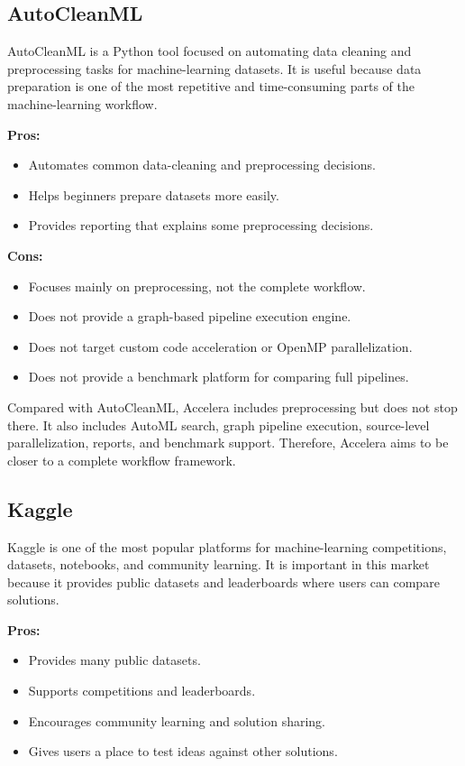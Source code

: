 \documentclass[12pt,a4paper]{report}
\begin{document}
\subsection{AutoCleanML}

AutoCleanML is a Python tool focused on automating data cleaning and
preprocessing tasks for machine-learning datasets. It is useful because data
preparation is one of the most repetitive and time-consuming parts of the
machine-learning workflow.

\textbf{Pros:}
\begin{itemize}
  \item Automates common data-cleaning and preprocessing decisions.
  \item Helps beginners prepare datasets more easily.
  \item Provides reporting that explains some preprocessing decisions.
\end{itemize}

\textbf{Cons:}
\begin{itemize}
  \item Focuses mainly on preprocessing, not the complete workflow.
  \item Does not provide a graph-based pipeline execution engine.
  \item Does not target custom code acceleration or OpenMP parallelization.
  \item Does not provide a benchmark platform for comparing full pipelines.
\end{itemize}

Compared with AutoCleanML, Accelera includes preprocessing but does not stop
there. It also includes AutoML search, graph pipeline execution, source-level
parallelization, reports, and benchmark support. Therefore, Accelera aims to be
closer to a complete workflow framework.

\subsection{Kaggle}

Kaggle is one of the most popular platforms for machine-learning competitions,
datasets, notebooks, and community learning. It is important in this market
because it provides public datasets and leaderboards where users can compare
solutions.

\textbf{Pros:}
\begin{itemize}
  \item Provides many public datasets.
  \item Supports competitions and leaderboards.
  \item Encourages community learning and solution sharing.
  \item Gives users a place to test ideas against other solutions.
\end{itemize}
\end{document}
